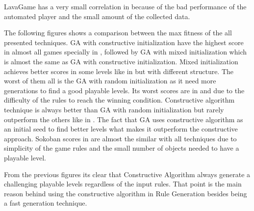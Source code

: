 LavaGame has a very small correlation in  because of the bad performance of the automated player and the small amount of the collected data.


The following figures shows a comparison between the max fitness of the all presented techniques. GA with constructive initialization have the highest score in almost all games specially in , followed by GA with mixed initialization which is almost the same as GA with constructive initialization. Mixed initialization achieves better scores in some levels like in  but with different structure. The worst of them all is the GA with random initialization as it need more generations to find a good playable levels. Its worst scores are in  and  due to the difficulty of the rules to reach the winning condition. Constructive algorithm technique is always better than GA with random initialization but rarely outperform the others like in . The fact that GA uses constructive algorithm as an initial seed to find better levels what makes it outperform the constructive approach. Sokoban scores in  are almost the similar with all techniques due to simplicity of the game rules and the small number of objects needed to have a playable level.






From the previous figures its clear that Constructive Algorithm always generate a challenging playable levels regardless of the input rules. That point is the main reason behind using the constructive algorithm in Rule Generation besides being a fast generation technique.

